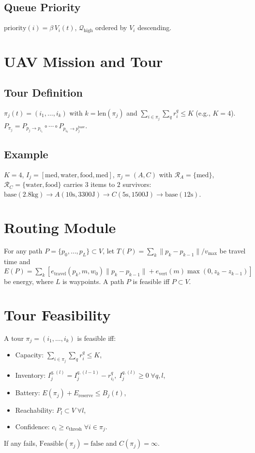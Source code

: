 \documentclass[conference]{IEEEtran}
\begin{document}
\subsection{Queue Priority}
$\text{priority}(i)=\beta\,V_i(t)$, $\mathcal{Q}_{\text{high}}$ ordered by $V_i$ descending.

\section{UAV Mission and Tour}

\subsection{Tour Definition}
$\pi_j(t)=(i_1,\dots,i_k)$ with $k=\text{len}(\pi_j)$ and $\sum_{i\in\pi_j}\sum_q r_i^q \leq K$ (e.g., $K=4$). $P_{\pi_j}=P_{p_j\to p_{i_1}}\circ\cdots\circ P_{p_{i_k}\to p_j^{\text{base}}}$.

\subsection{Example}
$K=4$, $I_j=[\text{med},\text{water},\text{food},\text{med}]$, $\pi_j=(A,C)$ with $\mathcal{R}_A=\{\text{med}\}$, $\mathcal{R}_C=\{\text{water},\text{food}\}$ carries $3$ items to $2$ survivors: $\text{base}(2.8\text{kg})\to A(10\text{s},3300\text{J})\to C(5\text{s},1500\text{J})\to\text{base}(12\text{s})$.

\section{Routing Module}
For any path $P=\{p_0,\dots,p_L\}\subset V$, let $T(P)=\sum_{k}\|p_k-p_{k-1}\|/v_{\max}$ be travel time and $E(P)=\sum_{k}[e_{\text{travel}}(p_k,m,w_0)\|p_k-p_{k-1}\|+e_{\text{vert}}(m)\max(0,z_k-z_{k-1})]$ be energy, where $L$ is waypoints. A path $P$ is feasible iff $P\subset V$.

\section{Tour Feasibility}
A tour $\pi_j=(i_1,\dots,i_k)$ is feasible iff:
\begin{itemize}
\item Capacity: $\sum_{i\in\pi_j}\sum_q r_i^q \leq K$,
\item Inventory: $I_j^{q,(l)}=I_j^{q,(l-1)}-r_{i_l}^q,\; I_j^{q,(l)}\geq0\;\forall q,l$,
\item Battery: $E(\pi_j)+E_{\text{reserve}}\leq B_j(t)$,
\item Reachability: $P_l\subset V\;\forall l$,
\item Confidence: $c_i\geq c_{\text{thresh}}\;\forall i\in\pi_j$.
\end{itemize}
If any fails, $\text{Feasible}(\pi_j)=\text{false}$ and $C(\pi_j)=\infty$.
\end{document}
